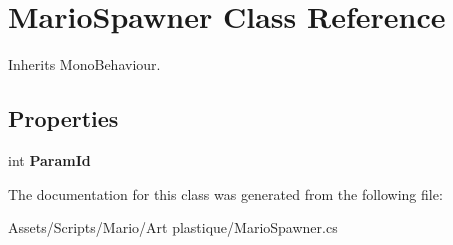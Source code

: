 \hypertarget{class_mario_spawner}{\section{Mario\-Spawner Class Reference}
\label{class_mario_spawner}
}


Inherits Mono\-Behaviour.

\subsection*{Properties}
\begin{DoxyCompactItemize}
\item 
\hypertarget{class_mario_spawner_a5fd0a147eeed3bdd461136fc85d33f45}{int {\bfseries Param\-Id}}\label{class_mario_spawner_a5fd0a147eeed3bdd461136fc85d33f45}

\end{DoxyCompactItemize}


The documentation for this class was generated from the following file\-:\begin{DoxyCompactItemize}
\item 
Assets/\-Scripts/\-Mario/\-Art plastique/Mario\-Spawner.\-cs\end{DoxyCompactItemize}
